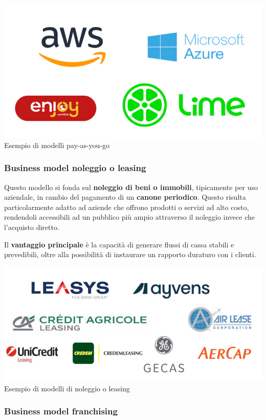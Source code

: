 \documentclass[14pt]{extarticle}
\begin{document}
\begin{center}
    \includegraphics[scale=0.70]{images/payasyougo.png}
    Esempio di modelli pay-as-you-go
\end{center}

\subsubsection{Business model noleggio o leasing}

Questo modello si fonda sul \textbf{noleggio di beni o immobili}, tipicamente
per uso aziendale, in cambio del pagamento di un \textbf{canone periodico}.
Questo risulta particolarmente adatto ad aziende che offrono prodotti o servizi
ad alto costo, rendendoli accessibili ad un pubblico più ampio attraverso il
noleggio invece che l'acquisto diretto.

Il \textbf{vantaggio principale} è la capacità di generare flussi di cassa
stabili e prevedibili, oltre alla possibilità di instaurare un rapporto duraturo
con i clienti.

\begin{center}
    \includegraphics[scale=0.60]{images/noleggio.png}
    Esempio di modelli di noleggio o leasing
\end{center}

\subsubsection{Business model franchising}
\end{document}
